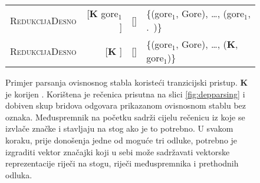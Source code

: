 \begin{figure}
\begin{tabular}{l|rlm{4cm}}
  \textsc{RedukcijaDesno}   & {[}\textbf{K} gore$_1$ {]}                          & {[}{]}                                                                      & \{(gore$_1$, Gore), \ldots, (gore$_1$, .~)\}  \\
  \textsc{RedukcijaDesno}   & {[}\textbf{K} {]}                                   & {[}{]}                                                                      & \{(gore$_1$, Gore), \ldots, (\textbf{K}, gore$_1$)\}  \\
  \end{tabular}
  \caption[Primjer parsanja ovisnosnog stabla koristeći tranzicijski
  pristup.]{Primjer parsanja ovisnosnog stabla koristeći tranzicijski pristup.
  \textbf{K} je korijen . Korištena je rečenica prisutna na slici
  \ref{fig:depparsing} i dobiven skup bridova odgovara prikazanom ovisnosnom
  stablu bez oznaka. Međuspremnik na početku sadrži cijelu rečenicu iz koje se
  izvlače značke i stavljaju na stog ako je to potrebno. U svakom koraku, prije
  donošenja jedne od moguće tri odluke, potrebno je izgraditi vektor značajki
  koji u sebi može sadržavati vektorske reprezentacije riječi na stogu, riječi
  međuspremnika i prethodnih odluka.}
  \label{fig:shiftreduce}
\end{figure}
